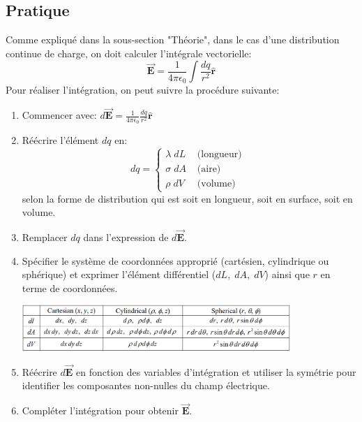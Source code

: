 \documentclass[a4paper]{article}
\begin{document}
\subsection{Pratique}






Comme expliqué dans la sous-section "Théorie", dans le cas d'une distribution continue de charge, on doit calculer l'intégrale vectorielle: \[ \vec{\textbf{E}} = \frac{1}{4 \pi \epsilon_0} \int \frac{d q}{r^2} \hat{\textbf{r}} \]
Pour réaliser l'intégration, on peut suivre la procédure suivante: 
\begin{enumerate}
    \item Commencer avec: $\displaystyle d \vec{\textbf{E}} = \frac{1}{4 \pi \epsilon_0} \frac{d q}{r^2} \hat{\textbf{r}} $
    \item Réécrire l'élément $ d q $ en: 
\[ d q =
\begin{cases}
\lambda \; d L      & \text{ (longueur) } \\
\sigma \; d A       & \text{ (aire) } \\
\rho \; d V         & \text{ (volume) }
\end{cases}
\]
selon la forme de distribution qui est soit en longueur, soit en surface, soit en volume.
    \item Remplacer $ d q $ dans l'expression de $ d \vec{\textbf{E}} $.
    \item Spécifier le système de coordonnées approprié (cartésien, cylindrique ou sphérique) et exprimer l'élément différentiel ($ d L, 
\; d A, \; d V $) ainsi que $ r $ en terme de coordonnées.

\begin{center}
\includegraphics[width=0.8\textwidth]{coordonnees.PNG}
\end{center}

    \item Réécrire $ d \vec{\textbf{E}} $ en fonction des variables d'intégration et utiliser la symétrie pour identifier les composantes 
non-nulles du champ électrique.
    \item Compléter l'intégration pour obtenir $ \vec{\textbf{E}} $.
\end{enumerate}
\end{document}
